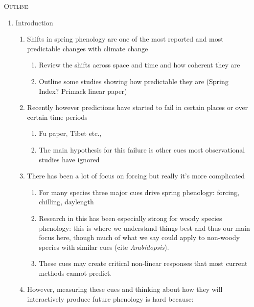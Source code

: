 \documentclass[11pt,letterpaper]{article}
\renewcommand{\section}[1]{%
\bigskip
\begin{center}
\begin{Large}
\normalfont\scshape #1
\medskip
\end{Large}
\end{center}}
\begin{document}
\section{Outline}
\begin{enumerate}
\item Introduction 
\begin{enumerate}
\item Shifts in spring phenology are one of the most reported and most predictable changes with climate change
\begin{enumerate}
\item Review the shifts across space and time and how coherent they are
\item Outline some studies showing how predictable they are (Spring Index? Primack linear paper)
\end{enumerate}
\item Recently however predictions have started to fail in certain places or over certain time periods
\begin{enumerate}
\item Fu paper, Tibet etc., 
\item The main hypothesis for this failure is other cues most observational studies have ignored
\end{enumerate}
\item There has been a lot of focus on forcing but really it's more complicated
\begin{enumerate}
\item For many species three major cues drive spring phenology: forcing, chilling, daylength
\item Research in this has been especially strong for woody species phenology: this is where we understand things best and thus our main focus here, though much of what we say could apply to non-woody species with similar cues (cite \emph{Arabidopsis}).
\item These cues may create critical non-linear responses that most current methods cannot predict.
\end{enumerate}
\item However, measuring these cues and thinking about how they will interactively produce future phenology is hard because:
\begin{enumerate}

\end{enumerate}
\end{enumerate}
\end{enumerate}
\end{document}

